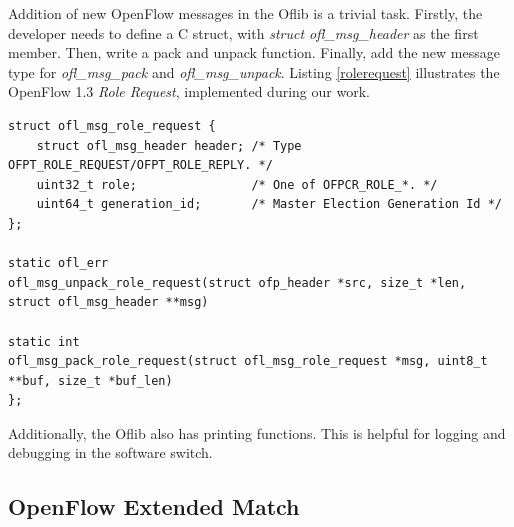 Addition of new OpenFlow messages in the Oflib is a trivial task. Firstly, the developer needs to define a C struct, with \textit{struct ofl_msg_header} as the first member. Then, write a pack and unpack function. Finally, add the new message type for \textit{ofl_msg_pack} and \textit{ofl_msg_unpack}. Listing \ref{rolerequest} illustrates the OpenFlow 1.3 \textit{Role Request}, implemented during our work. 
\pagebreak
\begin{lstlisting}[caption={Oflib message Role request struct and function definition}, label=rolerequest,]
struct ofl_msg_role_request {
	struct ofl_msg_header header; /* Type OFPT_ROLE_REQUEST/OFPT_ROLE_REPLY. */
	uint32_t role;                /* One of OFPCR_ROLE_*. */
	uint64_t generation_id;       /* Master Election Generation Id */
};

static ofl_err
ofl_msg_unpack_role_request(struct ofp_header *src, size_t *len, struct ofl_msg_header **msg)

static int
ofl_msg_pack_role_request(struct ofl_msg_role_request *msg, uint8_t **buf, size_t *buf_len)
};
\end{lstlisting}

Additionally, the Oflib also has printing functions. This is helpful for logging and debugging in the software switch.      

\subsection{OpenFlow Extended Match}
\label{sec:sec42}

